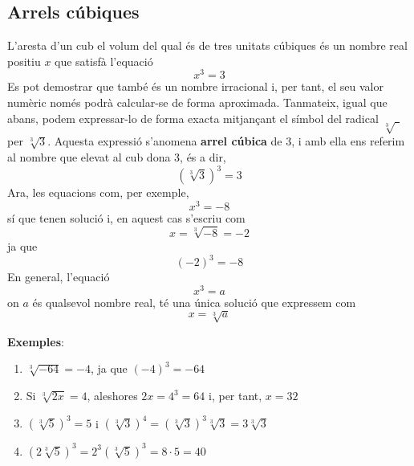 \subsection{Arrels cúbiques}

L’aresta d’un cub el volum del qual és de tres unitats cúbiques és un nombre real positiu $x$ que satisfà l’equació%
\begin{equation*}
x^{3}=3
\end{equation*}%
Es pot demostrar que també és un nombre irracional i, per tant,
el seu valor numèric només podrà calcular-se de forma aproximada. Tanmateix, igual que abans, podem expressar-lo de forma exacta mitjançant el símbol del radical $\sqrt[3]{~~}$ per $\sqrt[3]{3}$. Aquesta expressió
s’anomena \textbf{arrel cúbica} de $3$, i amb ella ens referim al nombre que elevat al cub dona $3$, és a dir,%
\begin{equation*}
\left( \sqrt[3]{3}\right) ^{3}=3
\end{equation*}%
Ara, les equacions com, per exemple,%
\begin{equation*}
x^{3}=-8
\end{equation*}%
sí que tenen solució i, en aquest cas s’escriu com 
\begin{equation*}
x=\sqrt[3]{-8}=-2
\end{equation*}%
ja que%
\begin{equation*}
\left( -2\right) ^{3}=-8
\end{equation*}%
En general, l’equació 
\begin{equation*}
x^{3}=a
\end{equation*}%
on $a$ és qualsevol nombre real, té una única solució
que expressem com%
\begin{equation*}
x=\sqrt[3]{a}
\end{equation*}

\textbf{Exemples}:

\begin{enumerate}
\item $\sqrt[3]{-64}=-4$, ja que $(-4)^{3}=-64$

\item Si $\sqrt[3]{2x}=4$, aleshores $2x=4^{3}=64$ i, per tant, $x=32$

\item $\left( \sqrt[3]{5}\right) ^{3}=5$ i $\left( \sqrt[3]{3}\right)
^{4}=\left( \sqrt[3]{3}\right) ^{3}\sqrt[3]{3}=3\sqrt[3]{3}$

\item $\left( 2\sqrt[3]{5}\right) ^{3}=2^{3}\left( \sqrt[3]{5}\right)
^{3}=8\cdot 5=40$
\end{enumerate}

